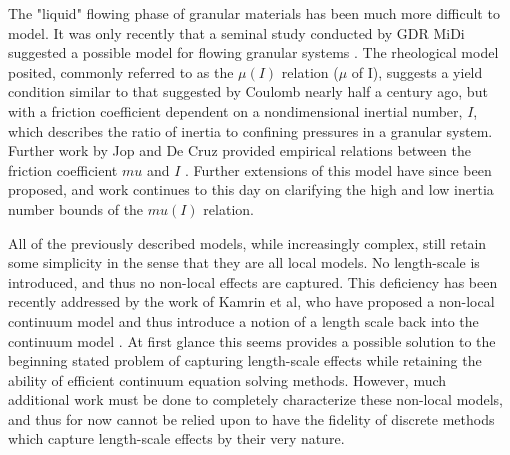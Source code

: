 The "liquid" flowing phase of granular materials has been much more difficult to model. It was only recently that a seminal study conducted by GDR MiDi suggested a possible model for flowing granular systems \cite{Midi:2004:Dense}. The rheological model posited, commonly referred to as the $\mu(I)$ relation ($\mu$ of I), suggests a yield condition similar to that suggested by Coulomb nearly half a century ago, but with a friction coefficient dependent on a nondimensional inertial number, $I$, which describes the ratio of inertia to confining pressures in a granular system. Further work by Jop and De Cruz provided empirical relations between the friction coefficient $mu$ and $I$ \cite{Jop:2006:Constitutive,Cruz:2008}. Further extensions of this model have since been proposed, and work continues to this day on clarifying the high and low inertia number bounds of the $mu(I)$ relation. 

All of the previously described models, while increasingly complex, still retain some simplicity in the sense that they are all local models. No length-scale is introduced, and thus no non-local effects are captured. This deficiency has been recently addressed by the work of Kamrin et al, who have proposed a non-local continuum model and thus introduce a notion of a length scale back into the continuum model \cite{Kamrin:2012:Nonlocal}. At first glance this seems provides a possible solution to the beginning stated problem of capturing length-scale effects while retaining the ability of efficient continuum equation solving methods. However, much additional work must be done to completely characterize these non-local models, and thus for now cannot be relied upon to have the fidelity of discrete methods which capture length-scale effects by their very nature.

